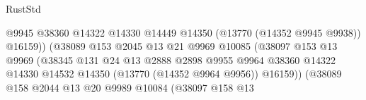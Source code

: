 \begin{lexlean}{RustStd}
\begin{coremodule}
                                                    @9945
                                                    @38360
                                                    @14322
                                                    @14330
                                                    @14449
                                                    @14350
                                                    (@13770 (@14352 @9945 @9938))
                                                    @16159))
                                                (@38089
                                                  @153
                                                  @2045
                                                  @13
                                                  @21
                                                  @9969
                                                  @10085
                                                  (@38097
                                                    @153
                                                    @13
                                                    @9969
                                                    (@38345
                                                      @131
                                                      @24
                                                      @13
                                                      @2888
                                                      @2898
                                                      @9955
                                                      @9964
                                                      @38360
                                                      @14322
                                                      @14330
                                                      @14532
                                                      @14350
                                                      (@13770 (@14352 @9964 @9956))
                                                      @16159))
                                                  (@38089
                                                    @158
                                                    @2044
                                                    @13
                                                    @20
                                                    @9989
                                                    @10084
                                                    (@38097
                                                      @158
                                                      @13

\end{coremodule}
\end{lexlean}
